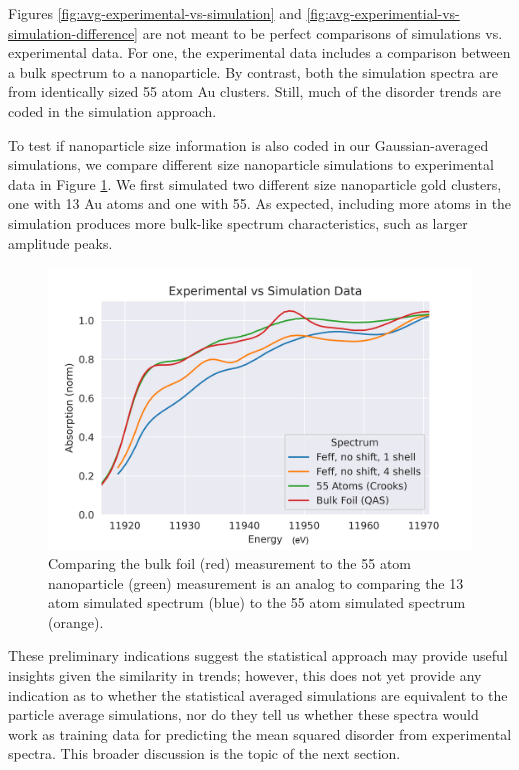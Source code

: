 Figures \ref{fig:avg-experimental-vs-simulation} and \ref{fig:avg-experimential-vs-simulation-difference} are not meant to be perfect comparisons of simulations vs. experimental data. For one, the experimental data includes a comparison between a bulk spectrum to a nanoparticle. By contrast, both the simulation spectra are from identically sized 55 atom  Au clusters. Still, much of the disorder trends are coded in the simulation approach. 

To test if nanoparticle size information is also coded in our Gaussian-averaged simulations, we compare different size nanoparticle simulations to experimental data in Figure \ref{fig:avg-experimental-vs-simulation2}. We first simulated two different size nanoparticle gold clusters, one with 13 Au atoms and one with 55. As expected, including more atoms in the simulation produces more bulk-like spectrum characteristics, such as larger amplitude peaks.

\begin{figure}[h]
	\centering
	\includegraphics[width=.7\linewidth]{Chapters/Figures/Bulk_55atom_experimental_theory_comparison.png}
	\caption[Simulation vs. Experimental XANES: Size Comparison]{Comparing the bulk foil (red) measurement to the 55 atom nanoparticle (green) measurement is an analog to comparing the 13 atom simulated spectrum (blue) to the 55 atom simulated spectrum (orange).}
	\label{fig:avg-experimental-vs-simulation2}
\end{figure}


These preliminary indications suggest the statistical approach may provide useful insights given the similarity in trends; however, this does not yet provide any indication as to whether the statistical averaged simulations are equivalent to the particle average simulations, nor do they tell us whether these spectra would work as training data for predicting the mean squared disorder from experimental spectra. This broader discussion is the topic of the next section.


